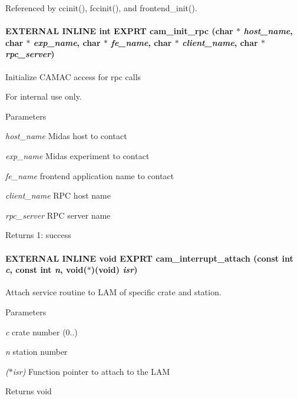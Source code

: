 Referenced by ccinit(), fccinit(), and frontend\_\-init().
\paragraph[{cam\_\-init\_\-rpc}]{\setlength{\rightskip}{0pt plus 5cm}EXTERNAL INLINE int EXPRT cam\_\-init\_\-rpc (char $\ast$ {\em host\_\-name}, \/  char $\ast$ {\em exp\_\-name}, \/  char $\ast$ {\em fe\_\-name}, \/  char $\ast$ {\em client\_\-name}, \/  char $\ast$ {\em rpc\_\-server})}\hfill\label{group__mcstdfunctionh_ga43ddc19c70912fb0eb4091579849e2ca}
Initialize CAMAC access for rpc calls \begin{DoxyInternal}{For internal use only.}

\begin{DoxyParams}{Parameters}
\item[{\em host\_\-name}]Midas host to contact \item[{\em exp\_\-name}]Midas experiment to contact \item[{\em fe\_\-name}]frontend application name to contact \item[{\em client\_\-name}]RPC host name \item[{\em rpc\_\-server}]RPC server name \end{DoxyParams}
\begin{DoxyReturn}{Returns}
1: success 
\end{DoxyReturn}
\end{DoxyInternal}
\paragraph[{cam\_\-interrupt\_\-attach}]{\setlength{\rightskip}{0pt plus 5cm}EXTERNAL INLINE void EXPRT cam\_\-interrupt\_\-attach (const int {\em c}, \/  const int {\em n}, \/  void($\ast$)(void) {\em isr})}\hfill\label{group__mcstdfunctionh_gaf23c4ba5de04fcabcc9ce5bb7441330b}
Attach service routine to LAM of specific crate and station. 
\begin{DoxyParams}{Parameters}
\item[{\em c}]crate number (0..) \item[{\em n}]station number \item[{\em ($\ast$isr)}]Function pointer to attach to the LAM \end{DoxyParams}
\begin{DoxyReturn}{Returns}
void 
\end{DoxyReturn}


